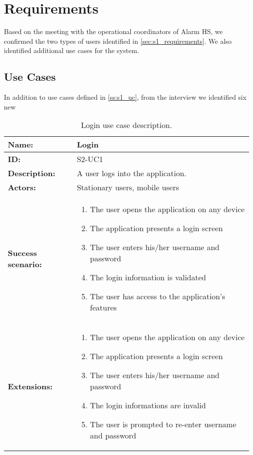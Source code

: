 \section{Requirements} \label{sec:s2_reqs}
Based on the meeting with the operational coordinators of Alarm HS, we confirmed the two types of users identified in \cref{sec:s1_requirements}. We also identified additional use cases for the system.

\subsection{Use Cases}
In addition to use cases defined in \cref{ss:s1_uc}, from the interview we identified six new 

\begin{table}[h!]
    \centering
    \begin{tabularx}{\textwidth}{|l|X|}
        \hline
        \textbf{Name:}  & Login \\ \hline
        \textbf{ID:}    & S2-UC1 \\ \hline
        \textbf{Description:} & A user logs into the application. \\ \hline
        \textbf{Actors:} & Stationary users, mobile users \\ \hline
        \textbf{Success scenario:} & 
        \begin{enumerate}
            \item The user opens the application on any device
            \item The application presents a login screen
            \item The user enters his/her username and password
            \item The login information is validated
            \item The user has access to the application's features
        \end{enumerate}
        \\ \hline
        \textbf{Extensions:} & 
        \begin{enumerate}
            \item The user opens the application on any device
            \item The application presents a login screen
            \item The user enters his/her username and password
            \item The login informations are invalid
            \item The user is prompted to re-enter username and password
        \end{enumerate}
        \\ \hline
    \end{tabularx}
    \caption{Login use case description.}
    \label{tab:s2-uc1}
\end{table}

